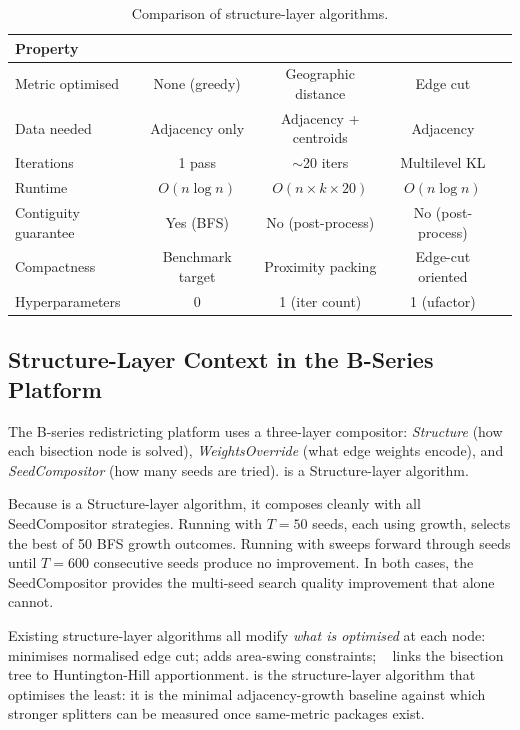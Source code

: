 \begin{table}[t]
\centering
\caption{Comparison of structure-layer algorithms.}
\label{tab:comparison-algorithms}
\begin{tabular}{lcccc}
\toprule
Property & \bfsg{} & \cvd{} & \metis{} \\
\midrule
Metric optimised & None (greedy) & Geographic distance & Edge cut \\
Data needed & Adjacency only & Adjacency + centroids & Adjacency \\
Iterations & 1 pass & $\sim$20 iters & Multilevel KL \\
Runtime & $O(n \log n)$ & $O(n \times k \times 20)$ & $O(n \log n)$ \\
Contiguity guarantee & Yes (BFS) & No (post-process) & No (post-process) \\
Compactness & Benchmark target & Proximity packing & Edge-cut oriented \\
Hyperparameters & 0 & 1 (iter count) & 1 (ufactor) \\
\bottomrule
\end{tabular}
\end{table}

\subsection{Structure-Layer Context in the B-Series Platform}

The B-series redistricting platform uses a three-layer compositor:
\emph{Structure} (how each bisection node is solved),
\emph{WeightsOverride} (what edge weights encode), and
\emph{SeedCompositor} (how many seeds are tried).
\bfsg{} is a Structure-layer algorithm.

Because \bfsg{} is a Structure-layer algorithm, it composes cleanly with
all SeedCompositor strategies.
Running \be{} with $T=50$ seeds, each using \bfsg{} growth, selects the
best of 50 BFS growth outcomes.
Running \cs{} with \bfsg{} sweeps forward through seeds until $T=600$
consecutive seeds produce no improvement.
In both cases, the SeedCompositor provides the multi-seed search
quality improvement that \bfsg{} alone cannot.

Existing structure-layer algorithms all modify \emph{what is optimised}
at each node:
\geosec{}~\citep{b8paper} minimises normalised edge cut;
\areasec{} adds area-swing constraints;
\ar{}~\citep{b11paper} links the bisection tree to Huntington-Hill
apportionment.
\bfsg{} is the structure-layer algorithm that optimises the least: it is the
minimal adjacency-growth baseline against which stronger splitters can be
measured once same-metric packages exist.
